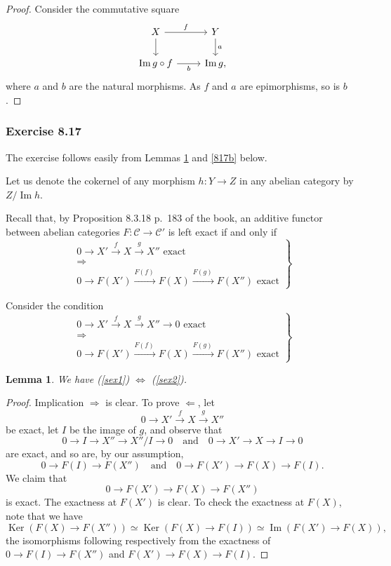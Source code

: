 \documentclass[12pt]{article}%
\newtheorem{lem}[thm]{Lemma}
\theoremstyle{remark}
\theoremstyle{definition}
\newcommand{\C}{\mathcal C}
\newcommand{\si}{\Leftarrow}
\newcommand{\ssi}{\Leftrightarrow}%
\newcommand{\then}{\Rightarrow}
\newcommand{\xr}{\xrightarrow}
\DeclareMathOperator{\Ima}{Im}
\DeclareMathOperator{\Ker}{Ker}
\begin{document}
\begin{proof} 
Consider the commutative square  
$$
\begin{tikzcd}
X\ar{d}\ar{r}{f}&Y\ar{d}{a}\\ 
\Ima g\circ f\ar{r}[swap]{b}&\Ima g,
\end{tikzcd}
$$ 
where $a$ and $b$ are the natural morphisms. As $f$ and $a$ are epimorphisms, so is $b$. 
\end{proof} 


\subsubsection{Exercise 8.17}

The exercise follows easily from Lemmas \ref{817a} and \ref{817b} below.

Let us denote the cokernel of any morphism $h:Y\to Z$ in any abelian category by $Z/\Ima h$. 

Recall that, by Proposition 8.3.18 p.~183 of the book, an additive functor between abelian categories $F:\C\to\C'$ is left exact if and only if
%
\begin{equation}\label{sex1}
\left.
\begin{matrix}
0\to X'\xr fX\xr gX''\text{ exact }\\ 
\then\\ 
0\to F(X')\overset{F(f)\ }{\longrightarrow}F(X)\overset{F(g)\ }{\longrightarrow}F(X'')\text{ exact}
\end{matrix}
\right\}
\end{equation}

Consider the condition
%
\begin{equation}\label{sex2}
\left.
\begin{matrix}
0\to X'\xr fX\xr gX''\to0\text{ exact }\\ 
\then\\ 
0\to F(X')\overset{F(f)\ }{\longrightarrow}F(X)\overset{F(g)\ }{\longrightarrow}F(X'')\text{ exact}
\end{matrix}
\right\}
\end{equation}
%
\begin{lem}\label{817a}
We have (\ref{sex1}) $\ssi$ (\ref{sex2}). 
\end{lem}
%
\begin{proof}
Implication $\then$ is clear. To prove $\si$, let 
$$
0\to X'\xr fX\xr gX''
$$
be exact, let $I$ be the image of $g$, and observe that 
$$
0\to I\to X''\to X''/I\to0\quad\text{and}\quad0\to X'\to X\to I\to0
$$ 
are exact, and so are, by our assumption, 
$$
0\to F(I)\to F(X'')\quad\text{and}\quad0\to F(X')\to F(X)\to F(I).
$$ 
We claim that 
$$
0\to F(X')\to F(X)\to F(X'')
$$ 
is exact. The exactness at $F(X')$ is clear. To check the exactness at $F(X)$, note that we have 
$$
\Ker(F(X)\to F(X''))\simeq\Ker(F(X)\to F(I))\simeq\Ima(F(X')\to F(X)),
$$ 
the isomorphisms following respectively from the exactness of $0\to F(I)\to F(X'')$ and $F(X')\to F(X)\to F(I)$.
\end{proof}
\end{document}
